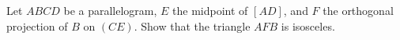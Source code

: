Let $ABCD$ be a parallelogram, $E$ the midpoint of $[AD]$, and $F$ the orthogonal projection of $B$ on $(CE)$. Show that the triangle $AFB$ is isosceles.
